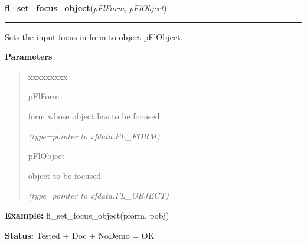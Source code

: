 \hspace{.8\funcindent}\begin{boxedminipage}{\funcwidth}

    \raggedright \textbf{fl\_set\_focus\_object}(\textit{pFlForm}, \textit{pFlObject})

    \vspace{-1.5ex}

    \rule{\textwidth}{0.5\fboxrule}
\setlength{\parskip}{2ex}
    Sets the input focus in form to object pFlObject.

\setlength{\parskip}{1ex}
      \textbf{Parameters}
      \vspace{-1ex}

      \begin{quote}
        \begin{Ventry}{xxxxxxxxx}

          \item[pFlForm]

          form whose object has to be focused

            {\it (type=pointer to xfdata.FL\_FORM)}

          \item[pFlObject]

          object to be focused

            {\it (type=pointer to xfdata.FL\_OBJECT)}

        \end{Ventry}

      \end{quote}

\textbf{Example:} fl\_set\_focus\_object(pform, pobj)



\textbf{Status:} Tested + Doc + NoDemo = OK



    \end{boxedminipage}

    \label{xformslib:flbasic:fl_set_focus_object}

    \vspace{0.5ex}

